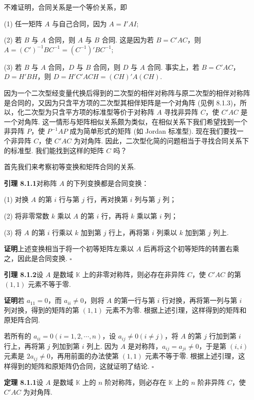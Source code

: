 \documentclass[UTF8, 12pt, fontset=fandol, oneside]{ctexart}
\begin{document}
不难证明，合同关系是一个等价关系，即

(1) 任一矩阵 $A$ 与自己合同，因为 $A=I'A I$;

(2) 若 $B$ 与 $A$ 合同，则 $A$ 与 $B$ 合同. 这是因为若 $B=C'AC$，则 $A=(C')^{-1}BC^{-1}=(C^{-1})'BC^{-1}$;

(3) 若 $B$ 与 $A$ 合同，$D$ 与 $B$ 合同，则 $D$ 与 $A$ 合同. 事实上，若 $B=C'AC$，$D=H'BH$，则 $D=H'C'ACH=(CH)'A(CH)$.

因为一个二次型经变量代换后得到的二次型的相伴对称阵与原二次型的相伴对称阵是合同的，又因为只含平方项的二次型其相伴矩阵是一个对角阵 (见例 8.1.3)，所以，化二次型为只含平方项的标准型等价于对称阵 $A$ 寻找非异阵 $C$，使 $C'AC$ 是一个对角阵. 这一情形与矩阵相似关系颇为类似，在相似关系下我们希望找到一个非异阵 $P$，使 $P^{-1}AP$ 成为简单形式的矩阵 (如 Jordan 标准型). 现在我们要找一个非异阵 $C$，使 $C'AC$ 为对角阵. 因此，二次型化简的问题相当于寻找合同关系下的标准型. 我们能找到这样的矩阵 $C$ 吗？

首先我们来考察初等变换和矩阵合同的关系.

\noindent\textbf{引理 8.1.1}\quad 对称阵 $A$ 的下列变换都是合同变换：

(1) 对换 $A$ 的第 $i$ 行与第 $j$ 行，再对换第 $i$ 列与第 $j$ 列；

(2) 将非零常数 $k$ 乘以 $A$ 的第 $i$ 行，再将 $k$ 乘以第 $i$ 列；

(3) 将 $A$ 的第 $i$ 行乘以 $k$ 加到第 $j$ 行上，再将第 $i$ 列乘以 $k$ 加到第 $j$ 列上.

\noindent\textbf{证明}\quad 上述变换相当于将一个初等矩阵左乘以 $A$ 后再将这个初等矩阵的转置右乘之，因此是合同变换. $\square$

\noindent\textbf{引理 8.1.2}\quad 设 $A$ 是数域 $\mathbb K$ 上的非零对称阵，则必存在非异阵 $C$，使 $C'AC$ 的第 $(1,1)$ 元素不等于零.

\noindent\textbf{证明}\quad 若 $a_{11}=0$，而 $a_{ii}\neq0$，则将 $A$ 的第一行与第 $i$ 行对换，再将第一列与第 $i$ 列对换，得到的矩阵的第 $(1,1)$ 元素不为零. 根据上述引理，这样得到的矩阵和原矩阵合同.

若所有的 $a_{ii}=0(i=1,2,\cdots,n)$，设 $a_{ij}\neq0(i\neq j)$，将 $A$ 的第 $j$ 行加到第 $i$ 行上，再将第 $j$ 列加到第 $i$ 列上. 因为 $A$ 是对称阵，$a_{ij}=a_{ji}\neq0$，于是第 $(i,i)$ 元素是 $2a_{ij}\neq0$，再用前面的办法使第 $(1,1)$ 元素不等于零. 根据上述引理，这样得到的矩阵和原矩阵仍合同，这就证明了结论. $\square$

\noindent\textbf{定理 8.1.1}\quad 设 $A$ 是数域 $\mathbb K$ 上的 $n$ 阶对称阵，则必存在 $\mathbb K$ 上的 $n$ 阶非异阵 $C$，使 $C'AC$ 为对角阵.
\end{document}

